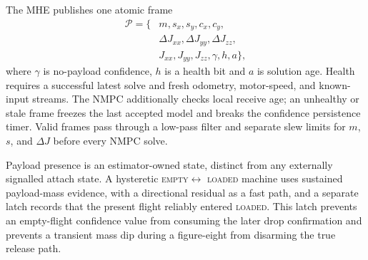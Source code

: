 \documentclass[conference]{IEEEtran}
\begin{document}
The MHE publishes one atomic frame
\begin{equation}
\begin{aligned}
\mathcal{P}=\bigl\{&m,s_x,s_y,c_x,c_y,\\
                 &\Delta J_{xx},\Delta J_{yy},\Delta J_{zz},\\
                 &J_{xx},J_{yy},J_{zz},\gamma,h,a\bigr\},
\end{aligned}
\label{eq:payload-frame}
\end{equation}
where $\gamma$ is no-payload confidence, $h$ is a health bit and $a$ is solution age. Health
requires a successful latest solve and fresh odometry, motor-speed, and known-input streams.
The NMPC additionally checks local receive age; an unhealthy or stale frame freezes the last
accepted model and breaks the confidence persistence timer. Valid frames pass through a
low-pass filter and separate slew limits for $m$, $s$, and $\Delta J$ before every NMPC solve.

Payload presence is an estimator-owned state, distinct from any externally signalled attach
state. A hysteretic \textsc{empty}$\leftrightarrow$
\textsc{loaded} machine uses sustained payload-mass evidence, with a directional residual as a
fast path, and a separate latch records that the present flight reliably entered
\textsc{loaded}. This latch prevents an empty-flight confidence value from consuming the later
drop confirmation and prevents a transient mass dip during a figure-eight from disarming the
true release path.
\end{document}
